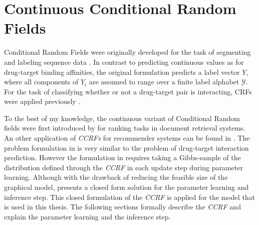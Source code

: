 \section{Continuous Conditional Random Fields}
\label{sec:CCRF}

Conditional Random Fields were originally developed for the task of segmenting and labeling sequence data \cite{lafferty2001conditional}. In contrast to predicting continuous values as for drug-target binding affinities, the original formulation predicts a label vector $Y$, where all components of $Y_i$ are assumed to range over a finite label alphabet $\mathcal{Y}$. For the task of classifying whether or not a drug-target pair is interacting, CRFs were applied previously \cite{yang2014drug}.


To the best of my knowledge, the continuous variant of Conditional Random fields were first introduced by \cite{qin2009global} for ranking tasks in document retrieval systems. An other application of \textit{CCRFs} for recommender systems can be found in \cite{xin2009social}. The problem formulation in \cite{xin2009social} is very similar to the problem of drug-target interaction prediction. However the formulation in \cite{xin2009social} requires taking a Gibbs-sample of the distribution defined through the \textit{CCRF} in each update step during parameter learning. Although with the drawback of reducing the feasible size of the graphical model, \cite{baltruvsaitis2013dimensional} presents a closed form solution for the parameter learning and inference step. This closed formulation of the \textit{CCRF} is applied for the model that is used in this thesis. The following sections formally describe the \textit{CCRF} and explain the parameter learning and the inference step.






